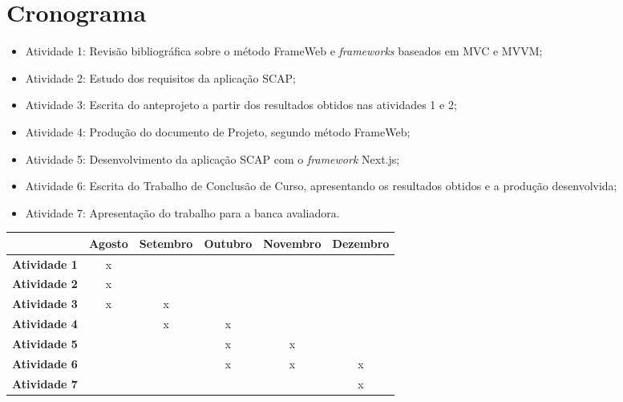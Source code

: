 \section{Cronograma}
\label{sec-intro-crono}

\begin{itemize}
\item Atividade 1: Revisão bibliográfica sobre o método FrameWeb e \textit{frameworks} baseados em MVC e MVVM;
\item Atividade 2: Estudo dos requisitos da aplicação SCAP;
\item Atividade 3: Escrita do anteprojeto a partir dos resultados obtidos nas atividades 1 e 2;
\item Atividade 4: Produção do documento de Projeto, segundo método FrameWeb;
\item Atividade 5: Desenvolvimento da aplicação SCAP com o \textit{framework} Next.js;
\item Atividade 6: Escrita do Trabalho de Conclusão de Curso, apresentando os resultados obtidos e a produção desenvolvida;
\item Atividade 7: Apresentação do trabalho para a banca avaliadora.
\end{itemize}

\begin{table}[h]
\centering
\begin{tabular}{c|c|c|c|c|c|}
\cline{2-6}
\multicolumn{1}{l|}{} & \textbf{Agosto} & \textbf{Setembro} & \textbf{Outubro} & \textbf{Novembro} & \textbf{Dezembro} \\ \hline
\multicolumn{1}{|c|}{\textbf{Atividade 1}} & x &   &   &   &   \\ \hline
\multicolumn{1}{|c|}{\textbf{Atividade 2}} & x &   &   &   &   \\ \hline
\multicolumn{1}{|c|}{\textbf{Atividade 3}} & x & x &   &   &   \\ \hline
\multicolumn{1}{|c|}{\textbf{Atividade 4}} &   & x & x &   &   \\ \hline
\multicolumn{1}{|c|}{\textbf{Atividade 5}} &   &   & x & x &   \\ \hline
\multicolumn{1}{|c|}{\textbf{Atividade 6}} &   &   & x & x & x \\ \hline
\multicolumn{1}{|c|}{\textbf{Atividade 7}} &   &   &   &   & x \\ \hline
\end{tabular}
\end{table}
